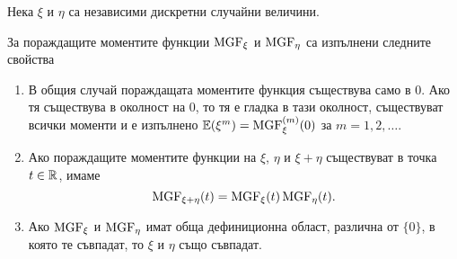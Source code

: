 \documentclass[numbers=endperiod, DIV=15, bibliography=totocnumbered]{scrartcl}
\begin{document}
\begin{theorem}\label{thm:mgf-props}
  Нека $\xi$ и $\eta$ са независими дискретни случайни величини.

  За пораждащите моментите функции $\operatorname{MGF}_\xi$ и $\operatorname{MGF}_\eta$ са изпълнени следните свойства
  \begin{enumerate}
    \item В общия случай пораждащата моментите функция съществува само в $0$. Ако тя съществува в околност на $0$, то тя е гладка в тази околност, съществуват всички моменти и е изпълнено $\mathbb{E}(\xi^m) = \operatorname{MGF}_\xi^{(m)} (0)$ за $m = 1, 2, \ldots$.

    \item Ако пораждащите моментите функции на $\xi$, $\eta$ и $\xi + \eta$ съществуват в точка $t \in \mathbb{R}$, имаме
    \begin{displaymath}
      \operatorname{MGF}_{\xi + \eta}(t) = \operatorname{MGF}_\xi(t) \operatorname{MGF}_\eta(t).
    \end{displaymath}

    \item Ако $\operatorname{MGF}_\xi$ и $\operatorname{MGF}_\eta$ имат обща дефиниционна област, различна от $\{ 0 \}$, в която те съвпадат, то $\xi$ и $\eta$ също съвпадат.
  \end{enumerate}
\end{theorem}
\end{document}
